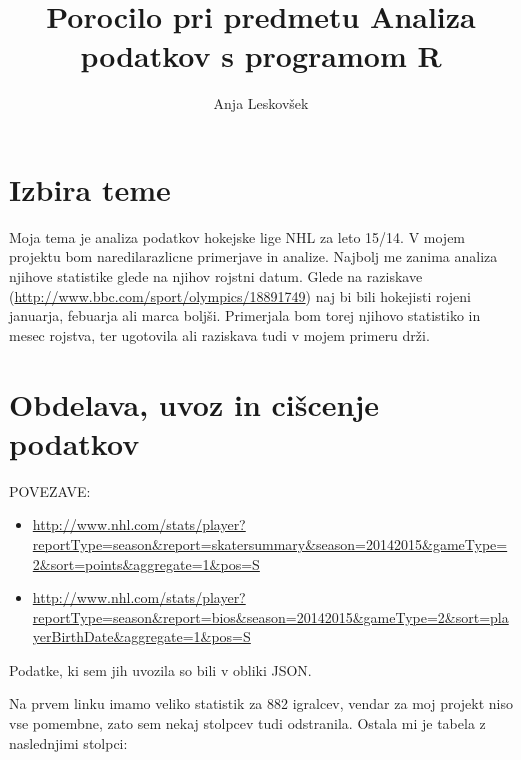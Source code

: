 \documentclass[]{article}
\title{Porocilo pri predmetu Analiza podatkov s programom R}
\author{Anja Leskovšek}
\date{}
\begin{document}
\maketitle


\section{Izbira teme}\label{izbira-teme}

Moja tema je analiza podatkov hokejske lige NHL za leto 15/14. V mojem
projektu bom naredilarazlicne primerjave in analize. Najbolj me zanima
analiza njihove statistike glede na njihov rojstni datum. Glede na
raziskave (\url{http://www.bbc.com/sport/olympics/18891749}) naj bi bili
hokejisti rojeni januarja, febuarja ali marca boljši. Primerjala bom
torej njihovo statistiko in mesec rojstva, ter ugotovila ali raziskava
tudi v mojem primeru drži.

\section{Obdelava, uvoz in cišcenje
podatkov}\label{obdelava-uvoz-in-ciscenje-podatkov}

POVEZAVE:

\begin{itemize}
\itemsep1pt\parskip0pt
\item
  \url{http://www.nhl.com/stats/player?reportType=season\&report=skatersummary\&season=20142015\&gameType=2\&sort=points\&aggregate=1\&pos=S}
\item
  \url{http://www.nhl.com/stats/player?reportType=season\&report=bios\&season=20142015\&gameType=2\&sort=playerBirthDate\&aggregate=1\&pos=S}
\end{itemize}

Podatke, ki sem jih uvozila so bili v obliki JSON.

Na prvem linku imamo veliko statistik za 882 igralcev, vendar za moj
projekt niso vse pomembne, zato sem nekaj stolpcev tudi odstranila.
Ostala mi je tabela z naslednjimi stolpci:
\end{document}
